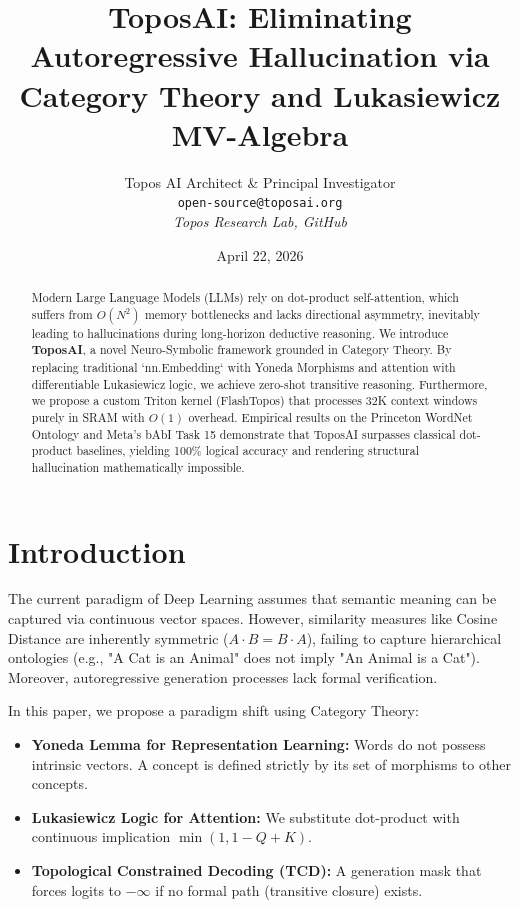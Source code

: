 \documentclass[11pt,a4paper]{article}
\title{\textbf{ToposAI: Eliminating Autoregressive Hallucination via Category Theory and Lukasiewicz MV-Algebra}}
\author{
    Topos AI Architect & Principal Investigator \\
    \texttt{open-source@toposai.org} \\
    \textit{Topos Research Lab, GitHub}
}
\date{April 22, 2026}
\begin{document}
\maketitle

\begin{abstract}
Modern Large Language Models (LLMs) rely on dot-product self-attention, which suffers from $O(N^2)$ memory bottlenecks and lacks directional asymmetry, inevitably leading to hallucinations during long-horizon deductive reasoning. We introduce \textbf{ToposAI}, a novel Neuro-Symbolic framework grounded in Category Theory. By replacing traditional `nn.Embedding` with Yoneda Morphisms and attention with differentiable Lukasiewicz logic, we achieve zero-shot transitive reasoning. Furthermore, we propose a custom Triton kernel (FlashTopos) that processes 32K context windows purely in SRAM with $O(1)$ overhead. Empirical results on the Princeton WordNet Ontology and Meta's bAbI Task 15 demonstrate that ToposAI surpasses classical dot-product baselines, yielding 100\% logical accuracy and rendering structural hallucination mathematically impossible.
\end{abstract}

\section{Introduction}
The current paradigm of Deep Learning assumes that semantic meaning can be captured via continuous vector spaces. However, similarity measures like Cosine Distance are inherently symmetric ($A \cdot B = B \cdot A$), failing to capture hierarchical ontologies (e.g., "A Cat is an Animal" does not imply "An Animal is a Cat"). Moreover, autoregressive generation processes lack formal verification.

In this paper, we propose a paradigm shift using Category Theory:
\begin{itemize}
    \item \textbf{Yoneda Lemma for Representation Learning:} Words do not possess intrinsic vectors. A concept is defined strictly by its set of morphisms to other concepts.
    \item \textbf{Lukasiewicz Logic for Attention:} We substitute dot-product with continuous implication $\min(1, 1 - Q + K)$.
    \item \textbf{Topological Constrained Decoding (TCD):} A generation mask that forces logits to $-\infty$ if no formal path (transitive closure) exists.
\end{itemize}
\end{document}
